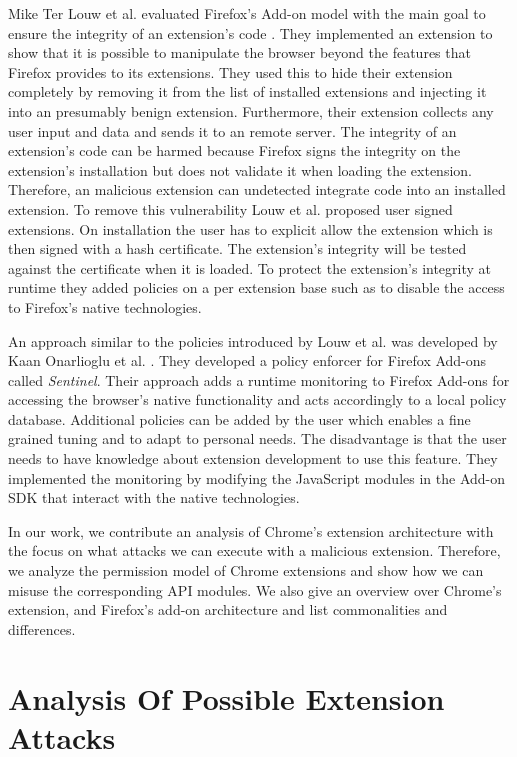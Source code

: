 	Mike Ter Louw et al. evaluated Firefox's Add-on model with the main goal to ensure the integrity of an extension's code \cite{TerLouw:2007:EWB:1420581.1420583}. They implemented an extension to show that it is possible to manipulate the browser beyond the features that Firefox provides to its extensions. They used this to hide their extension completely by removing it from the list of installed extensions and injecting it into an presumably benign extension. Furthermore, their extension collects any user input and data and sends it to an remote server. The integrity of an extension's code can be harmed because Firefox signs the integrity on the extension's installation but does not validate it when loading the extension. Therefore, an malicious extension can undetected integrate code into an installed extension. To remove this vulnerability Louw et al. proposed user signed extensions. On installation the user has to explicit allow the extension which is then signed with a hash certificate. The extension's integrity will be tested against the certificate when it is loaded. To protect the extension's integrity at runtime they added policies on a per extension base such as to disable the access to Firefox's native technologies. 
	
	An approach similar to the policies introduced by Louw et al. was developed by Kaan Onarlioglu et al. \cite{cs2015sentinel}. They developed a policy enforcer for Firefox Add-ons called \textit{Sentinel}. Their approach adds a runtime monitoring to Firefox Add-ons for accessing the browser's native functionality and acts accordingly to a local policy database. Additional policies can be added by the user which enables a fine grained tuning and to adapt to personal needs. The disadvantage is that the user needs to have knowledge about extension development to use this feature. They implemented the monitoring by modifying the JavaScript modules in the Add-on SDK that interact with the native technologies.  
	
	In our work, we contribute an analysis of Chrome's extension architecture with the focus on what attacks we can execute with a malicious extension. Therefore, we analyze the permission model of Chrome extensions and show how we can misuse the corresponding API modules. We also give an overview over Chrome's extension, and Firefox's add-on architecture and list commonalities and differences.



\section{Analysis Of Possible Extension Attacks}
	
